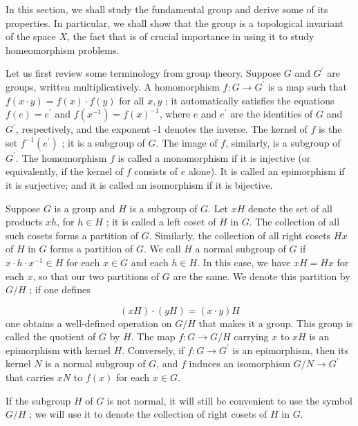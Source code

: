 In this section, we shall study the fundamental group and derive some of its properties. In particular, we shall show that the group is a topological invariant of the space \(X\), the fact that is of crucial importance in using it to study homeomorphism problems.

Let us first review some terminology from group theory. Suppose \(G\) and \(G^{\prime }\) are groups, written multiplicatively. A homomorphism \(f : G \rightarrow {G}^{\prime }\) is a map such that \(f( {x \cdot y}) = f(x) \cdot f( y)\) for all \(x,y\) ; it automatically satisfies the equations \(f( e) = e^{\prime }\) and \(f( x^{-1}) = f{(x) }^{-1}\), where \(e\) and \(e^{\prime }\) are the identities of \(G\) and \(G^{\prime }\), respectively, and the exponent -1 denotes the inverse. The kernel of \(f\) is the set \(f^{-1}( e^{\prime })\) ; it is a subgroup of \(G\). The image of \(f\), similarly, is a subgroup of \(G^{\prime }\). The homomorphism \(f\) is called a monomorphism if it is injective (or equivalently, if the kernel of \(f\) consists of \(e\) alone). It is called an epimorphism if it is surjective; and it is called an isomorphism if it is bijective.

Suppose \(G\) is a group and \(H\) is a subgroup of \(G\). Let \({xH}\) denote the set of all products \({xh}\), for \(h \in H\) ; it is called a left coset of \(H\) in \(G\). The collection of all such cosets forms a partition of \(G\). Similarly, the collection of all right cosets \({Hx}\) of \(H\) in \(G\) forms a partition of \(G\). We call \(H\) a normal subgroup of \(G\) if \(x \cdot h \cdot {x}^{-1} \in H\) for each \(x \in G\) and each \(h \in H\). In this case, we have \({xH} = {Hx}\) for each \(x\), so that our two partitions of \(G\) are the same. We denote this partition by \(G/H\) ; if one defines

\[
( {xH}) \cdot ( {yH}) = ( {x \cdot y}) H
\]
one obtains a well-defined operation on \(G/H\) that makes it a group. This group is called the quotient of \(G\) by \(H\). The map \(f : G \rightarrow G/H\) carrying \(x\) to \({xH}\) is an epimorphism with kernel \(H\). Conversely, if \(f : G \rightarrow {G}^{\prime }\) is an epimorphism, then its kernel \(N\) is a normal subgroup of \(G\), and \(f\) induces an isomorphism \(G/N \rightarrow {G}^{\prime }\) that carries \({xN}\) to \(f(x)\) for each \(x \in G\).

If the subgroup \(H\) of \(G\) is not normal, it will still be convenient to use the symbol \(G/H\) ; we will use it to denote the collection of right cosets of \(H\) in \(G\).

